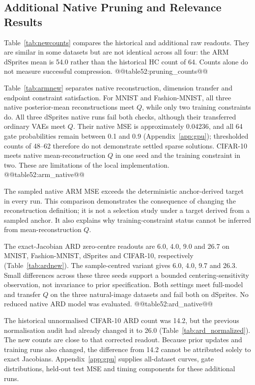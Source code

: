 \subsection{Additional Native Pruning and Relevance Results}\label{sec:newpruning}
Table~\ref{tab:newcounts} compares the historical and additional raw
readouts. They are similar in some datasets but are not identical across
all four: the ARM dSprites mean is 54.0 rather than the historical HC
count of 64. Counts alone do not measure successful compression.
@@table52:pruning_counts@@

Table~\ref{tab:armnew} separates native reconstruction, dimension transfer
and endpoint constraint satisfaction. For MNIST and Fashion-MNIST,
all three native posterior-mean reconstructions meet $Q$, while only
two training constraints do. All three dSprites native runs fail both
checks, although their transferred ordinary VAEs meet $Q$. Their native
MSE is approximately 0.04236, and all 64 gate probabilities remain
between 0.1 and 0.9 (Appendix~\ref{app:gpu}); thresholded counts of 48--62
therefore do not demonstrate settled sparse solutions. CIFAR-10 meets
native mean-reconstruction $Q$ in one seed and the training constraint
in two. These are limitations of the local implementation.
@@table52:arm_native@@

The sampled native ARM MSE exceeds the deterministic anchor-derived
target in every run. This comparison demonstrates the consequence of
changing the reconstruction definition; it is not a selection study
under a target derived from a sampled anchor. It also explains why
training-constraint status cannot be inferred from mean-reconstruction $Q$.

The exact-Jacobian ARD zero-centre readouts are 6.0, 4.0, 9.0 and 26.7
on MNIST, Fashion-MNIST, dSprites and CIFAR-10, respectively
(Table~\ref{tab:ardnew}). The sample-centred variant gives 6.0, 4.0, 9.7
and 26.3. Small differences across these three seeds support a bounded
centering-sensitivity observation, not invariance to prior specification.
Both settings meet full-model and transfer $Q$ on the three natural-image
datasets and fail both on dSprites. No reduced native ARD model was evaluated.
@@table52:ard_native@@

The historical unnormalised CIFAR-10 ARD count was 14.2, but the
previous normalisation audit had already changed it to 26.0
(Table~\ref{tab:ard_normalized}). The new counts are close to that
corrected readout. Because prior updates and training runs also changed,
the difference from 14.2 cannot be attributed solely to exact Jacobians.
Appendix~\ref{app:gpu} supplies all-dataset curves, gate distributions,
held-out test MSE and timing components for these additional runs.
